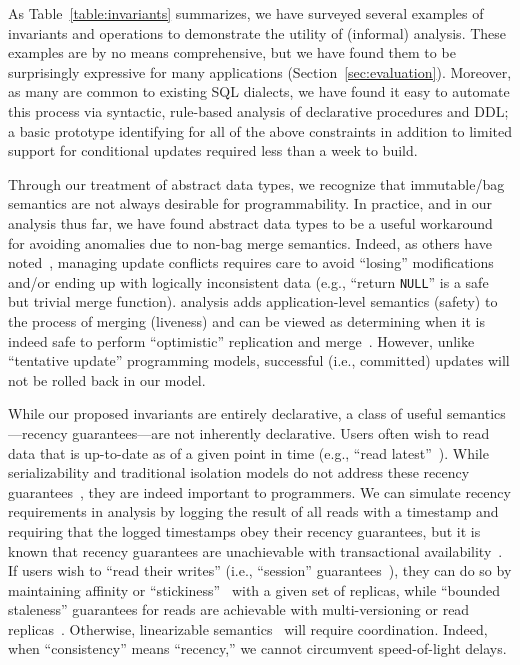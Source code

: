 As Table~\ref{table:invariants} summarizes, we have surveyed several
examples of invariants and operations to demonstrate the utility of
(informal) \iconfluence analysis. These examples are by no means
comprehensive, but we have found them to be surprisingly expressive
for many applications (Section~\ref{sec:evaluation}). Moreover, as
many are common to existing SQL dialects, we have found it easy to
automate this process via syntactic, rule-based analysis of
declarative procedures and DDL; a basic prototype identifying
\iconfluence for all of the above constraints in addition to limited
support for conditional updates required less than a week to build.

Through our treatment of abstract data types, we recognize that
immutable/bag semantics are not always desirable for
programmability. In practice, and in our analysis thus far, we have
found abstract data types to be a useful workaround for avoiding
anomalies due to non-bag merge semantics. Indeed, as others have
noted~\cite{bayou,gray-book}, managing update conflicts requires care
to avoid ``losing'' modifications and/or ending up with logically
inconsistent data (e.g., ``return \texttt{NULL}'' is a safe but
trivial merge function). \iconfluence analysis adds application-level
semantics (safety) to the process of merging (liveness) and can be
viewed as determining when it is indeed safe to perform ``optimistic''
replication and merge~\cite{optimistic}. However, unlike ``tentative
update'' programming models, successful (i.e., committed) updates will
not be rolled back in our model.

While our proposed invariants are entirely declarative, a class of
useful semantics---recency guarantees---are not inherently
declarative. Users often wish to read data that is up-to-date as of a
given point in time (e.g., ``read latest''~\cite{pnuts}). While
serializability and traditional isolation models do not address these
recency guarantees~\cite{adya-isolation}, they are indeed important to
programmers. We can simulate recency requirements in \iconfluence
analysis by logging the result of all reads with a timestamp and
requiring that the logged timestamps obey their recency guarantees,
but it is known that recency guarantees are unachievable with
transactional availability~\cite{hat-vldb}. If users wish to ``read
their writes'' (i.e., ``session'' guarantees~\cite{bayou}), they can
do so by maintaining affinity or
``stickiness''~\cite{hat-vldb,vogels-defs} with a given set of
replicas, while ``bounded staleness'' guarantees for reads are
achievable with multi-versioning or read
replicas~\cite{pnuts}. Otherwise, linearizable
semantics~\cite{spanner} will require coordination. Indeed, when
``consistency'' means ``recency,'' we cannot circumvent speed-of-light
delays.

